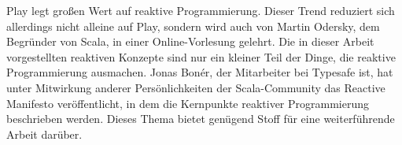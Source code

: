 Play legt großen Wert auf reaktive Programmierung.
Dieser Trend reduziert sich allerdings nicht alleine auf Play, sondern wird auch von Martin Odersky, dem Begründer von Scala, in einer Online-Vorlesung \cite[vgl.][]{principles_of_reactive_programming} gelehrt.
Die in dieser Arbeit vorgestellten reaktiven Konzepte sind nur ein kleiner Teil der Dinge, die reaktive Programmierung ausmachen.
Jonas Bonér, der Mitarbeiter bei Typesafe ist, hat unter Mitwirkung anderer Persönlichkeiten der Scala-Community das Reactive Manifesto \cite[vgl.][]{reactive_manifesto} veröffentlicht, in dem die Kernpunkte reaktiver Programmierung beschrieben werden.
Dieses Thema bietet genügend Stoff für eine weiterführende Arbeit darüber.


